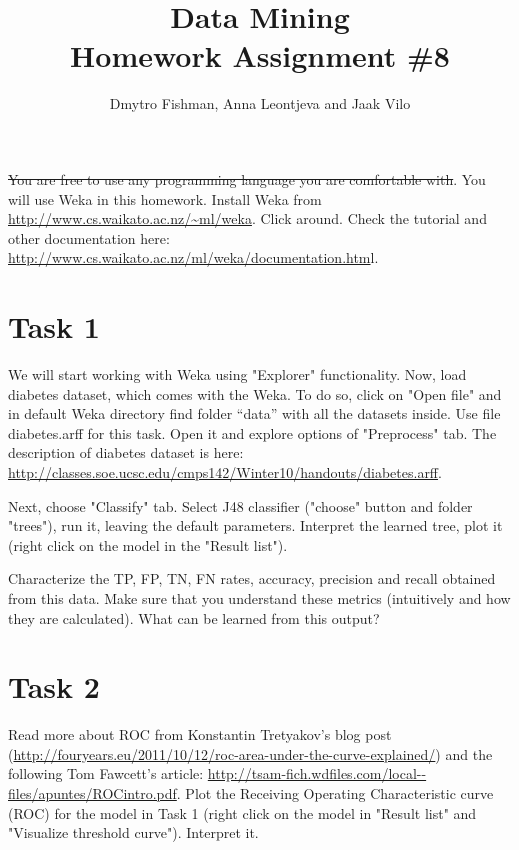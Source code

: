\documentclass{article}
\title{Data Mining\\Homework Assignment \#8} %
\author{Dmytro Fishman, Anna Leontjeva and Jaak Vilo} %
\begin{document}
\maketitle %

\st{You are free to use any programming language you are comfortable with}. You will use Weka in this homework. Install Weka from \url{http://www.cs.waikato.ac.nz/~ml/weka}. Click around. Check the tutorial and other documentation here: \url{http://www.cs.waikato.ac.nz/ml/weka/documentation.htm}l.

\section*{Task 1}
We will start working with Weka using "Explorer" functionality. Now, load diabetes dataset, which comes with the Weka. To do so, click on "Open file" and in default Weka directory find folder ``data'' with all the datasets inside. Use file diabetes.arff for this task. Open it and explore options of "Preprocess" tab. The description of diabetes dataset is here: \url{http://classes.soe.ucsc.edu/cmps142/Winter10/handouts/diabetes.arff}.
 
Next, choose "Classify" tab. Select J48 classifier ("choose" button and folder "trees"), run it, leaving the default parameters. Interpret the learned tree, plot it (right click on the model in the "Result list"). 

Characterize the TP, FP, TN, FN rates, accuracy, precision and recall obtained from this data. Make sure that you understand these metrics (intuitively and how they are calculated). What can be learned from this output?

\section*{Task 2}
Read more about ROC from Konstantin Tretyakov's blog post (\url{http://fouryears.eu/2011/10/12/roc-area-under-the-curve-explained/}) and the following Tom Fawcett's article: \url{http://tsam-fich.wdfiles.com/local--files/apuntes/ROCintro.pdf}. Plot the Receiving Operating Characteristic curve (ROC) for the model in Task 1 (right click on the model in "Result list" and "Visualize threshold curve"). Interpret it. 
\end{document}
